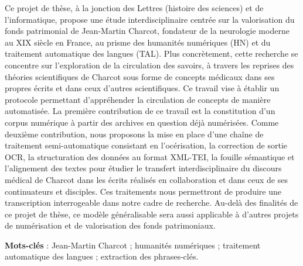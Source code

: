 

Ce projet de thèse, à la jonction des Lettres (histoire des sciences) et de l'informatique, propose une étude interdisciplinaire centrée sur la valorisation du fonds patrimonial de Jean-Martin Charcot, fondateur de la neurologie moderne au XIX\ieme{} siècle en France, au prisme des humanités numériques (\textsc{HN}) et du traitement automatique des langues (\textsc{TAL}). Plus concrètement, cette recherche se concentre sur l'exploration de la circulation des savoirs, à travers les reprises des théories scientifiques de Charcot sous forme de concepts médicaux dans ses propres écrits et dans ceux d'autres scientifiques. Ce travail vise à établir un protocole permettant d'appréhender la circulation de concepts de manière automatisée. La première contribution de ce travail est la constitution d'un corpus numérique à partir des archives en question déjà numérisées. Comme deuxième contribution, nous proposons la mise en place d'une chaîne de traitement semi-automatique consistant en l'océrisation, la correction de sortie OCR, la structuration des données au format XML-TEI, la fouille sémantique et l'alignement des textes pour étudier le transfert interdisciplinaire du discours médical de Charcot dans les écrits réalisés en collaboration et dans ceux de ses continuateurs et disciples. Ces traitements nous permettront de produire une transcription interrogeable dans notre cadre de recherche. Au-delà des finalités de ce projet de thèse, ce modèle généralisable sera aussi applicable à d'autres projets de numérisation et de valorisation des fonds patrimoniaux.

\textbf{Mots-clés} : Jean-Martin Charcot ; humanités numériques ; traitement automatique des langues ; extraction des phrases-clés.


%
